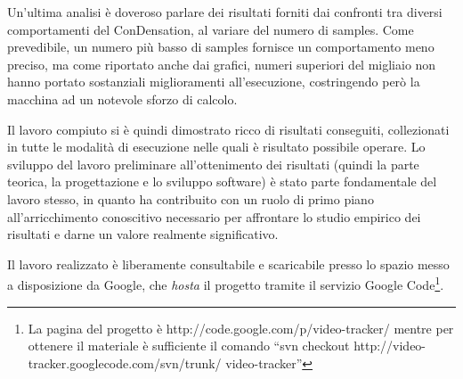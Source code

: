 Un'ultima analisi è doveroso parlare dei risultati forniti dai confronti tra diversi comportamenti del ConDensation, al variare del numero di samples. Come prevedibile, un numero più basso di samples fornisce un comportamento meno preciso, ma come riportato anche dai grafici, numeri superiori del migliaio non hanno portato sostanziali miglioramenti all'esecuzione, costringendo però la macchina ad un notevole sforzo di calcolo.

Il lavoro compiuto si è quindi dimostrato ricco di risultati conseguiti, collezionati in tutte le modalità di esecuzione nelle quali è risultato possibile operare. Lo sviluppo del lavoro preliminare all'ottenimento dei risultati (quindi la parte teorica, la progettazione e lo sviluppo software) è stato parte fondamentale del lavoro stesso, in quanto ha contribuito con un ruolo di primo piano all'arricchimento conoscitivo necessario per affrontare lo studio empirico dei risultati e darne un valore realmente significativo. 

Il lavoro realizzato è liberamente consultabile e scaricabile presso lo spazio messo a disposizione da Google, che \textit{hosta} il progetto tramite il servizio Google Code\footnote{La pagina del progetto è http://code.google.com/p/video-tracker/ mentre per ottenere il materiale è sufficiente il comando ``svn checkout http://video-tracker.googlecode.com/svn/trunk/ video-tracker''}.
